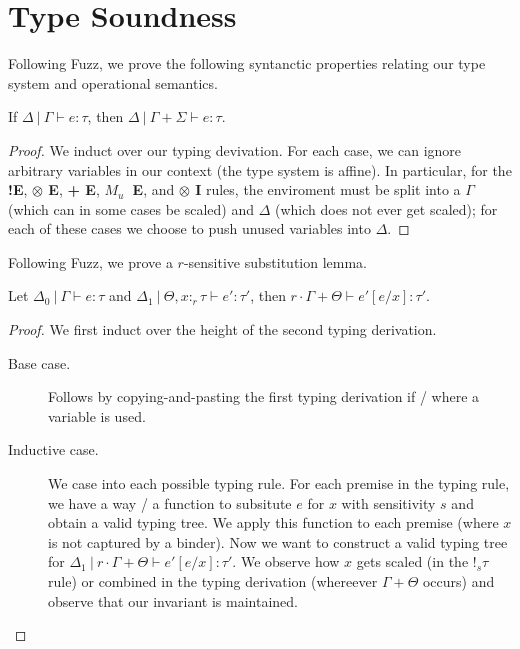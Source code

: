 \section{Type Soundness}
Following Fuzz, we prove the following syntanctic properties relating our type
system and operational semantics.

\begin{lemma}[Weakening]\label{thm:weakening}
  If $\Delta \ | \ \Gamma \vdash e : \tau$, then 
  $\Delta \ | \ \Gamma + \Sigma \vdash e : \tau$.
\end{lemma}
\begin{proof}
  We induct over our typing devivation. 
  For each case, we can ignore arbitrary variables in our context (the type system is
  affine). 
  In particular, for the \textbf{!E}, \textbf{$\otimes$ E}, \textbf{+ E},
  \textbf{$M_u$~E}, and \textbf{$\otimes$ I} rules, the enviroment must be split
  into a $\Gamma$ (which can in some cases be scaled) and $\Delta$ (which does
  not ever get scaled); for each of these cases we choose to push unused
  variables into $\Delta$. 
\end{proof}

Following Fuzz, we prove a $r$-sensitive substitution lemma.
\begin{lemma}\label{thm:substitution}
  Let $\Delta_0 \ | \ \Gamma \vdash e : \tau$ and 
  $\Delta_1 \ | \ \Theta, x :_r \tau \vdash e' : \tau'$, then 
  $r \cdot \Gamma + \Theta \vdash e'[e/x] : \tau'$.
\end{lemma}
\begin{proof}
  We first induct over the height of the second typing derivation. 
  \begin{description}
    \item[Base case.] Follows by copying-and-pasting the first typing derivation
      if / where a variable is used.
    \item[Inductive case.] We case into each possible typing rule. 
      For each premise in the typing rule, we have a way / a function to
      subsitute $e$ for $x$ with sensitivity $s$ and obtain a valid typing tree. 
      We apply this function to each premise (where $x$ is not captured by a
      binder). 
      Now we want to construct a valid typing tree for $\Delta_1 \ | \ r \cdot \Gamma + \Theta
      \vdash e'[e/x] : \tau'$. We observe how $x$ gets scaled (in the $!_s \tau$
      rule) or combined in the typing derivation (whereever $\Gamma + \Theta$
      occurs) and observe that our invariant is maintained.
  \end{description}
\end{proof}

